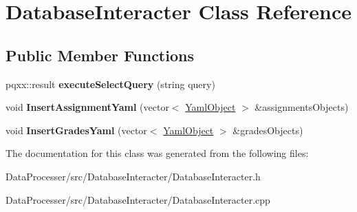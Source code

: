\hypertarget{classDatabaseInteracter}{}\section{Database\+Interacter Class Reference}
\label{classDatabaseInteracter}
\subsection*{Public Member Functions}
\begin{DoxyCompactItemize}
\item 
\mbox{\label{classDatabaseInteracter_a8f23f688eab08f1fc0166ccaf9fb7e22}} 
pqxx\+::result {\bfseries execute\+Select\+Query} (string query)
\item 
\mbox{\label{classDatabaseInteracter_a42c45f50c4b443fdd0110bda56c311bf}} 
void {\bfseries Insert\+Assignment\+Yaml} (vector$<$ \hyperlink{classYamlObject}{Yaml\+Object} $>$ \&assignments\+Objects)
\item 
\mbox{\label{classDatabaseInteracter_a5da7ef4c3fa49cbd64cf28b3532382db}} 
void {\bfseries Insert\+Grades\+Yaml} (vector$<$ \hyperlink{classYamlObject}{Yaml\+Object} $>$ \&grades\+Objects)
\end{DoxyCompactItemize}


The documentation for this class was generated from the following files\+:\begin{DoxyCompactItemize}
\item 
Data\+Processer/src/\+Database\+Interacter/Database\+Interacter.\+h\item 
Data\+Processer/src/\+Database\+Interacter/Database\+Interacter.\+cpp\end{DoxyCompactItemize}
